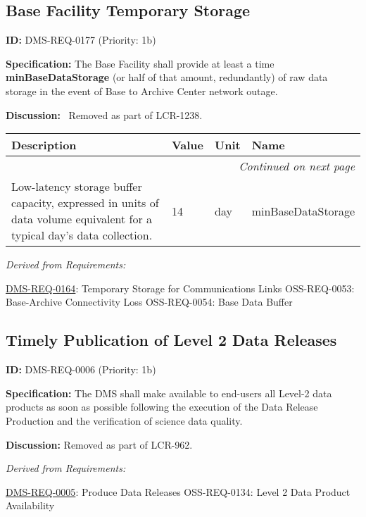 \documentclass[SE,toc,lsstdraft]{lsstdoc}
\makeatletter
\newcommand{\paramname}[1]{\hspace{0pt}#1}
\newcommand{\unitname}[1]{\hspace{0pt}#1}
\newcommand{\addendum}{}
\newenvironment{parameters}[0]{%
\setlength\LTleft{0pt}
\setlength\LTright{\fill}
\begin{small}
\begin{longtable}[]{|p{0.49\textwidth}|l|p{0.6in}|p{1.70in}@{}|}

\hline \textbf{Description} & \textbf{Value} & \textbf{Unit} & \textbf{Name} \\ \hline
\endhead

\hline \multicolumn{4}{r}{\emph{Continued on next page}} \\
\endfoot

\hline\hline
\endlastfoot
}{%
\hline
\end{longtable}
\end{small}
}
\makeatother
\begin{document}
\subsection{Base Facility Temporary Storage}

\label{DMS-REQ-0177}
\textbf{ID:} DMS-REQ-0177 (Priority: 1b)

\textbf{Specification:} The Base Facility shall provide at least a time \textbf{minBaseDataStorage }(or half of that amount, redundantly) of raw data storage in the event of Base to Archive Center network outage.

\textbf{Discussion:}
 Removed as part of LCR-1238.

\begin{parameters}
Low-latency storage buffer capacity, expressed in units of data volume equivalent for a typical day's data collection.
&
14
&
\unitname{%
day
}
&
\paramname{%
minBaseDataStorage
} \\\hline
\end{parameters}

\emph{Derived from Requirements:}

\hyperref[DMS-REQ-0164]{DMS-REQ-0164}:
Temporary Storage for Communications Links \newline
OSS-REQ-0053:
Base-Archive Connectivity Loss \newline
OSS-REQ-0054:
Base Data Buffer \newline

\subsection{Timely Publication of Level 2 Data Releases}

\label{DMS-REQ-0006}
\textbf{ID:} DMS-REQ-0006 (Priority: 1b)

\textbf{Specification:} The DMS shall make available to end-users all Level-2 data products as soon as possible following the execution of the Data Release Production and the verification of science data quality.

\textbf{Discussion:}
Removed as part of LCR-962.

\emph{Derived from Requirements:}

\hyperref[DMS-REQ-0005]{DMS-REQ-0005}:
Produce Data Releases \newline
OSS-REQ-0134:
Level 2 Data Product Availability \newline

\addendum


\end{document}
